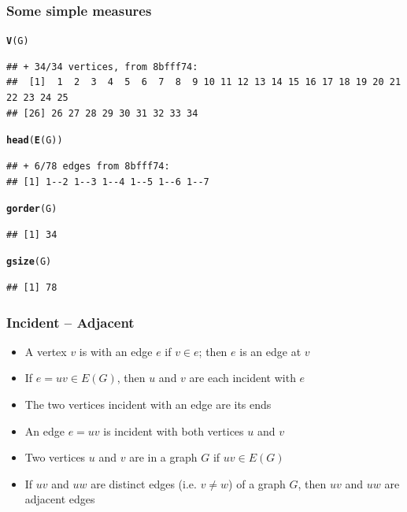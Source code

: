 \documentclass[aspectratio=169]{beamer}\usepackage[]{graphicx}\usepackage[]{xcolor}
\makeatletter
\newcommand{\hldef}[1]{\textcolor[rgb]{0.345,0.345,0.345}{#1}}%
\newcommand{\hlkwd}[1]{\textcolor[rgb]{0.737,0.353,0.396}{\textbf{#1}}}%
\newenvironment{kframe}{%
 \def\at@end@of@kframe{}%
 \ifinner\ifhmode%
  \def\at@end@of@kframe{\end{minipage}}%
  \begin{minipage}{\columnwidth}%
 \fi\fi%
 \def\FrameCommand##1{\hskip\@totalleftmargin \hskip-\fboxsep
 \colorbox{shadecolor}{##1}\hskip-\fboxsep
     \hskip-\linewidth \hskip-\@totalleftmargin \hskip\columnwidth}%
 \MakeFramed {\advance\hsize-\width
   \@totalleftmargin\z@ \linewidth\hsize
   \@setminipage}}%
 {\par\unskip\endMakeFramed%
 \at@end@of@kframe}
\newenvironment{knitrout}{}{} %
\makeatother
\begin{document}
\begin{frame}[fragile]\frametitle{Some simple measures}
\begin{knitrout}
\color{fgcolor}\begin{kframe}
\begin{alltt}
\hlkwd{V}\hldef{(G)}
\end{alltt}
\begin{verbatim}
## + 34/34 vertices, from 8bfff74:
##  [1]  1  2  3  4  5  6  7  8  9 10 11 12 13 14 15 16 17 18 19 20 21 22 23 24 25
## [26] 26 27 28 29 30 31 32 33 34
\end{verbatim}
\begin{alltt}
\hlkwd{head}\hldef{(}\hlkwd{E}\hldef{(G))}
\end{alltt}
\begin{verbatim}
## + 6/78 edges from 8bfff74:
## [1] 1--2 1--3 1--4 1--5 1--6 1--7
\end{verbatim}
\begin{alltt}
\hlkwd{gorder}\hldef{(G)}
\end{alltt}
\begin{verbatim}
## [1] 34
\end{verbatim}
\begin{alltt}
\hlkwd{gsize}\hldef{(G)}
\end{alltt}
\begin{verbatim}
## [1] 78
\end{verbatim}
\end{kframe}
\end{knitrout}
\end{frame}

\begin{frame}\frametitle{Incident -- Adjacent}
	\begin{definition}[Incident]
	\begin{itemize}
	\item A vertex $v$ is  with an edge $e$ if $v\in e$; then $e$ is an edge at $v$
	\item If $e=uv\in E(G)$, then $u$ and $v$ are each incident with $e$
	\item The two vertices incident with an edge are its ends
	\item An edge $e=uv$ is incident with both vertices $u$ and $v$
	\end{itemize}
	\end{definition}
	\vfill
	\begin{definition}[Adjacent]
	\begin{itemize}
	\item Two vertices $u$ and $v$ are  in a graph $G$ if $uv\in E(G)$
	\item If $uv$ and $uw$ are distinct edges (i.e. $v\not=w$) of a graph $G$, then $uv$ and $uw$ are adjacent edges
	\end{itemize}
	\end{definition}
\end{frame}
\end{document}
